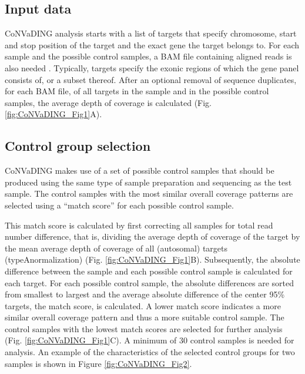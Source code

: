 \subsection{Input data}
CoNVaDING analysis starts with a list of targets that specify chromosome, start and stop position of the target and the exact gene the target belongs to. 
For each sample and the possible control samples, a BAM file containing aligned reads is also needed \cite{Li_2009}. 
Typically, targets specify the exonic regions of which the gene panel consists of, or a subset thereof. 
After an optional removal of sequence duplicates, for each BAM file, of all targets in the sample and in the possible control samples, the average depth of coverage is calculated (Fig. \ref{fig:CoNVaDING_Fig1}A).

\subsection{Control group selection}
CoNVaDING makes use of a set of possible control samples that should be produced using the same type of sample preparation and sequencing as the test sample.
The control samples with the most similar overall coverage patterns are selected using a “match score” for each possible control sample.

This match score is calculated by first correcting all samples for total read number difference, that is, dividing the average depth of coverage of the target by the mean average depth of coverage of all (autosomal) targets (typeAnormalization) (Fig. \ref{fig:CoNVaDING_Fig1}B).
Subsequently, the absolute difference between the sample and each possible control sample is calculated for each target.
For each possible control sample, the absolute differences are sorted from smallest to largest and the average absolute difference of the center 95\% targets, the match score, is calculated.
A lower match score indicates a more similar overall coverage pattern and thus a more suitable control sample. The control samples with the lowest match scores are selected for further analysis (Fig. \ref{fig:CoNVaDING_Fig1}C).
A minimum of 30 control samples is needed for analysis. 
An example of the characteristics of the selected control groups for two samples is shown in Figure \ref{fig:CoNVaDING_Fig2}.


